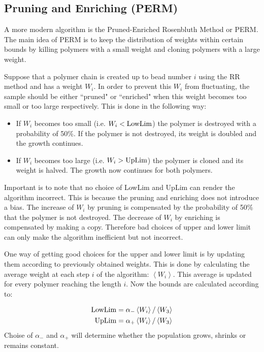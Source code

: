 \subsection*{Pruning and Enriching (PERM)}
A more modern algorithm is the Pruned-Enriched Rosenbluth Method or PERM. The main idea of PERM is to keep the distribution of weights within certain bounds by killing polymers with a small weight and cloning polymers with a large weight.

Suppose that a polymer chain is created up to bead number $i$ using the RR method and has a weight $W_i$. In order to prevent this $W_i$ from fluctuating, the sample should be either ``pruned" or ``enriched" when this weight becomes too small or too large respectively. This is done in the following way:

\begin{itemize}
  \item If $W_i$ becomes too small (i.e. $W_i < \textup{LowLim}$) the polymer is destroyed with a probability of 50\%. If the polymer is not destroyed, its weight is doubled and the growth continues.
  \item If $W_i$ becomes too large (i.e. $W_i > \textup{UpLim}$) the polymer is cloned and its weight is halved. The growth now continues for both polymers.
\end{itemize}

Important is to note that no choice of LowLim and UpLim can render the algorithm incorrect. This is because the pruning and enriching does not introduce a bias. The increase of $W_i$ by pruning is compensated by the probability of 50\% that the polymer is not destroyed. The decrease of $W_i$ by enriching is compensated by making a copy. Therefore bad choices of upper and lower limit can only make the algorithm inefficient but not incorrect.

One way of getting good choices for the upper and lower limit is by updating them according to previously obtained weights. This is done by calculating the average weight at each step $i$ of the algorithm: $\left \langle W_i \right \rangle$. This average is updated for every polymer reaching the length $i$. Now the bounds are calculated according to:

\begin{equation} \label{eq:LowLim_UpLim}
\begin{aligned}
	\textup{LowLim} &= \alpha_- \left \langle W_i \right \rangle / \left \langle W_3 \right \rangle \\
	\textup{UpLim} &= \alpha_+ \left \langle W_i \right \rangle / \left \langle W_3 \right \rangle
\end{aligned}
\end{equation}
Choise of $\alpha_-$ and $\alpha_+$ will determine whether the population grows, shrinks or remains constant.

